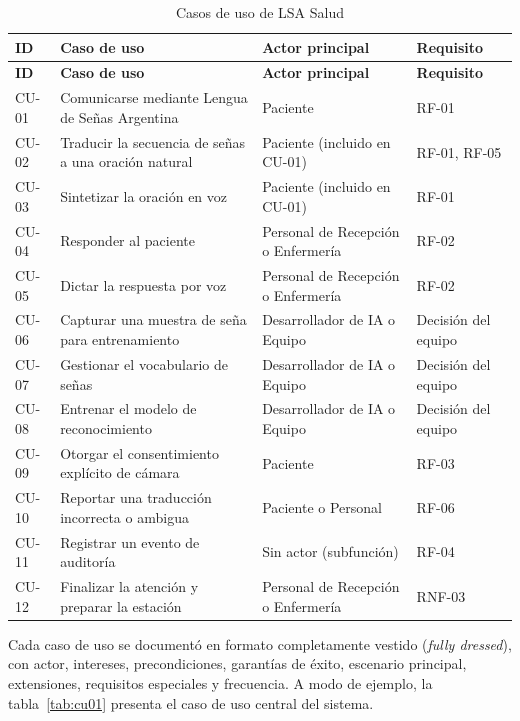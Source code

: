 \begin{longtable}{>{\raggedright\arraybackslash}p{1.4cm} >{\raggedright\arraybackslash}p{6.6cm} >{\raggedright\arraybackslash}p{3.8cm} >{\raggedright\arraybackslash}p{2.5cm}}
  \caption{Casos de uso de LSA Salud}\label{tab:cu}\\
  \toprule
  \textbf{ID} & \textbf{Caso de uso} & \textbf{Actor principal} & \textbf{Requisito} \\
  \midrule
  \endfirsthead
  \toprule
  \textbf{ID} & \textbf{Caso de uso} & \textbf{Actor principal} & \textbf{Requisito} \\
  \midrule
  \endhead
  CU-01 & Comunicarse mediante Lengua de Señas Argentina & Paciente & RF-01 \\
  CU-02 & Traducir la secuencia de señas a una oración natural & Paciente (incluido en CU-01) & RF-01, RF-05 \\
  CU-03 & Sintetizar la oración en voz & Paciente (incluido en CU-01) & RF-01 \\
  CU-04 & Responder al paciente & Personal de Recepción o Enfermería & RF-02 \\
  CU-05 & Dictar la respuesta por voz & Personal de Recepción o Enfermería & RF-02 \\
  CU-06 & Capturar una muestra de seña para entrenamiento & Desarrollador de IA o Equipo & Decisión del equipo \\
  CU-07 & Gestionar el vocabulario de señas & Desarrollador de IA o Equipo & Decisión del equipo \\
  CU-08 & Entrenar el modelo de reconocimiento & Desarrollador de IA o Equipo & Decisión del equipo \\
  CU-09 & Otorgar el consentimiento explícito de cámara & Paciente & RF-03 \\
  CU-10 & Reportar una traducción incorrecta o ambigua & Paciente o Personal & RF-06 \\
  CU-11 & Registrar un evento de auditoría & Sin actor (subfunción) & RF-04 \\
  CU-12 & Finalizar la atención y preparar la estación & Personal de Recepción o Enfermería & RNF-03 \\
  \bottomrule
\end{longtable}

Cada caso de uso se documentó en formato completamente vestido (\emph{fully dressed}), con actor, intereses, precondiciones, garantías de éxito, escenario principal, extensiones, requisitos especiales y frecuencia. A modo de ejemplo, la tabla~\ref{tab:cu01} presenta el caso de uso central del sistema.

